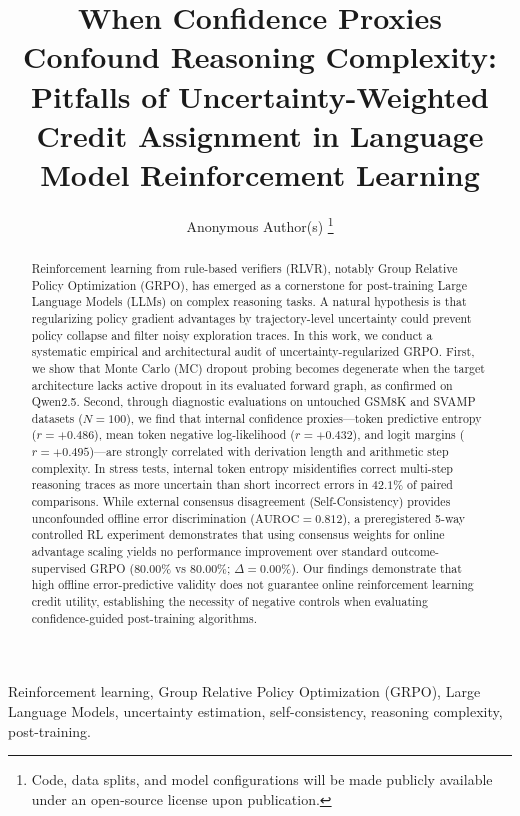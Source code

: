 \documentclass[journal]{IEEEtai}
\title{When Confidence Proxies Confound Reasoning Complexity: Pitfalls of Uncertainty-Weighted Credit Assignment in Language Model Reinforcement Learning}
\author{Anonymous Author(s)%
\thanks{Code, data splits, and model configurations will be made publicly available under an open-source license upon publication.}}
\begin{document}
\maketitle

\begin{abstract}
Reinforcement learning from rule-based verifiers (RLVR), notably Group Relative Policy Optimization (GRPO), has emerged as a cornerstone for post-training Large Language Models (LLMs) on complex reasoning tasks. A natural hypothesis is that regularizing policy gradient advantages by trajectory-level uncertainty could prevent policy collapse and filter noisy exploration traces. In this work, we conduct a systematic empirical and architectural audit of uncertainty-regularized GRPO. First, we show that Monte Carlo (MC) dropout probing becomes degenerate when the target architecture lacks active dropout in its evaluated forward graph, as confirmed on Qwen2.5. Second, through diagnostic evaluations on untouched GSM8K and SVAMP datasets ($N=100$), we find that internal confidence proxies---token predictive entropy ($r = +0.486$), mean token negative log-likelihood ($r = +0.432$), and logit margins ($r = +0.495$)---are strongly correlated with derivation length and arithmetic step complexity. In stress tests, internal token entropy misidentifies correct multi-step reasoning traces as more uncertain than short incorrect errors in $42.1\%$ of paired comparisons. While external consensus disagreement (Self-Consistency) provides unconfounded offline error discrimination ($\text{AUROC} = 0.812$), a preregistered 5-way controlled RL experiment demonstrates that using consensus weights for online advantage scaling yields no performance improvement over standard outcome-supervised GRPO ($80.00\%$ vs $80.00\%$; $\Delta = 0.00\%$). Our findings demonstrate that high offline error-predictive validity does not guarantee online reinforcement learning credit utility, establishing the necessity of negative controls when evaluating confidence-guided post-training algorithms.
\end{abstract}

\begin{IEEEkeywords}
Reinforcement learning, Group Relative Policy Optimization (GRPO), Large Language Models, uncertainty estimation, self-consistency, reasoning complexity, post-training.
\end{IEEEkeywords}
\end{document}
